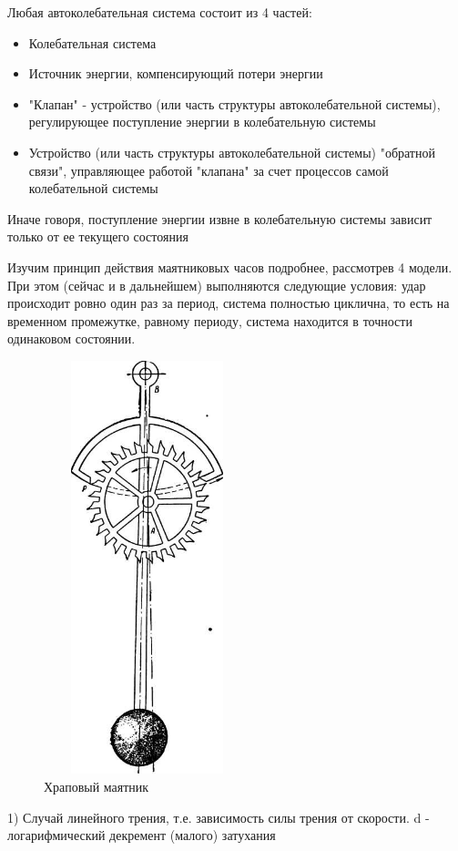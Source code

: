 \documentclass[12pt,a4paper]{article}
\begin{document}
Любая автоколебательная система состоит из 4 частей:
\begin{itemize}
\item Колебательная система
\item Источник энергии, компенсирующий потери энергии
\item "Клапан" - устройство (или часть структуры автоколебательной системы), регулирующее поступление энергии в колебательную системы 
\item Устройство (или часть структуры автоколебательной системы) "обратной связи", управляющее работой "клапана" за счет процессов самой колебательной системы
\end{itemize}
Иначе говоря, поступление энергии извне в колебательную системы зависит только от ее текущего состояния
\par Изучим принцип действия маятниковых часов подробнее, рассмотрев 4 модели. При этом (сейчас и в дальнейшем) выполняются следующие условия: удар происходит ровно один раз за период, система полностью циклична, то есть на временном промежутке, равному периоду, система находится в точности одинаковом состоянии.  \hfill \break
\begin{figure}[H]
\centering
\includegraphics[width=6cm, height=12cm]{ВПВ_5}
\caption{Храповый маятник}
\label{pic:1}
\end{figure}
1) Случай линейного трения, т.е. зависимость силы трения от скорости.  \hfill \break
d - логарифмический декремент (малого) затухания \hfill \break
\end{document}
